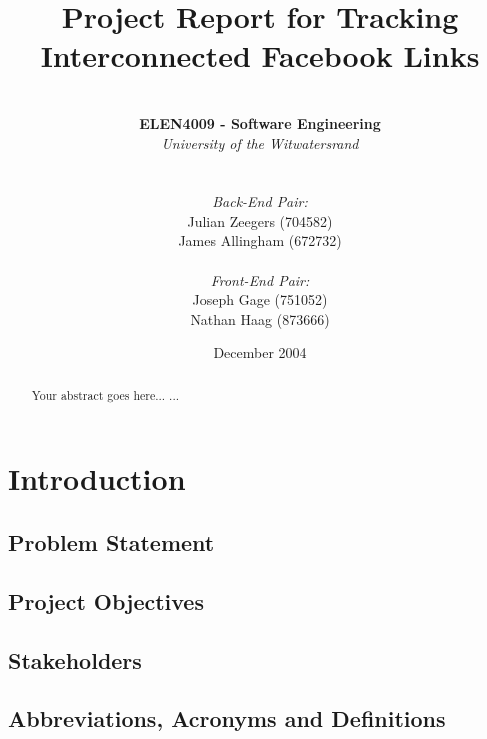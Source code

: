 \documentclass[12pt,onecolumn]{article}
\title{\vspace{-4.2cm} \huge Project Report for Tracking Interconnected Facebook Links }
\author{ \horrule{1pt} \\ \textbf{ELEN4009 - Software Engineering} \\ \emph{University of the Witwatersrand} \\ \horrule{1pt} \\\\ \emph{Back-End Pair:} \\ Julian Zeegers (704582) \\ James Allingham (672732) \\ \\ \emph{Front-End Pair:} \\ Joseph Gage (751052)\\ Nathan Haag (873666) \\ \horrule{1pt}}
\date{December 2004}
\begin{document}
\date{\vspace{-5ex}}
\maketitle
\pagestyle{plain}
\thispagestyle{empty}

\begin{abstract}
Your abstract goes here...
...
\end{abstract}

\newpage

\tableofcontents
\thispagestyle{empty}
\setcounter{page}{0}

\newpage

\section{Introduction}

	\subsection{Problem Statement} %

	\subsection{Project Objectives} %

	\subsection{Stakeholders} %

	\subsection{Abbreviations, Acronyms and Definitions} %
\end{document}
